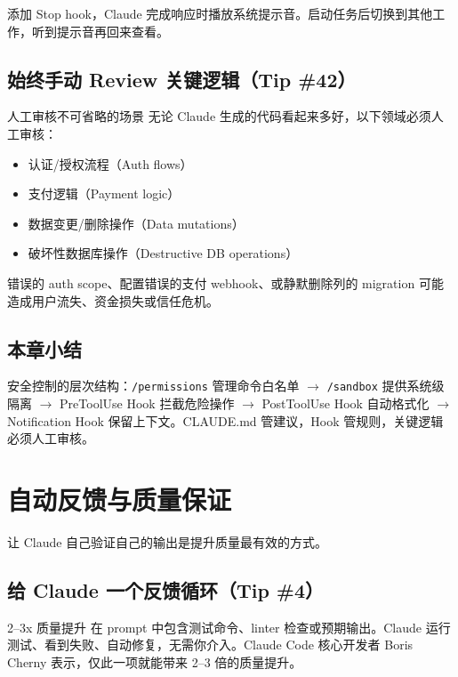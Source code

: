 \documentclass[a4paper]{article}
\begin{document}
添加 Stop hook，Claude 完成响应时播放系统提示音。启动任务后切换到其他工作，听到提示音再回来查看。

\subsection{始终手动 Review 关键逻辑（Tip \#42）}

\begin{warningbox}{人工审核不可省略的场景}
无论 Claude 生成的代码看起来多好，以下领域必须人工审核：
\begin{itemize}[nosep]
  \item 认证/授权流程（Auth flows）
  \item 支付逻辑（Payment logic）
  \item 数据变更/删除操作（Data mutations）
  \item 破坏性数据库操作（Destructive DB operations）
\end{itemize}
错误的 auth scope、配置错误的支付 webhook、或静默删除列的 migration 可能造成用户流失、资金损失或信任危机。
\end{warningbox}

\subsection{本章小结}

安全控制的层次结构：\texttt{/permissions} 管理命令白名单 $\to$ \texttt{/sandbox} 提供系统级隔离 $\to$ PreToolUse Hook 拦截危险操作 $\to$ PostToolUse Hook 自动格式化 $\to$ Notification Hook 保留上下文。CLAUDE.md 管建议，Hook 管规则，关键逻辑必须人工审核。

\section{自动反馈与质量保证}

让 Claude 自己验证自己的输出是提升质量最有效的方式。

\subsection{给 Claude 一个反馈循环（Tip \#4）}

\begin{importantbox}{2--3x 质量提升}
在 prompt 中包含测试命令、linter 检查或预期输出。Claude 运行测试、看到失败、自动修复，无需你介入。Claude Code 核心开发者 Boris Cherny 表示，仅此一项就能带来 2--3 倍的质量提升。
\end{importantbox}
\end{document}

